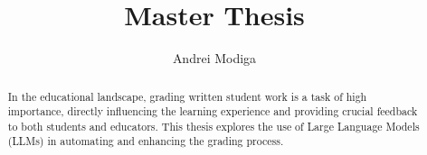 \documentclass[ms,twoside,print]{nuthesis}
\begin{document}
\frontmatter

\title{Master Thesis}
\author{Andrei Modiga}



\maketitle

\begin{abstract}
In the educational landscape, grading written student work is a task of high importance, directly influencing the learning experience and providing crucial feedback to both students and educators. This thesis explores the use of Large Language Models (LLMs) in automating and enhancing the grading process.
\end{abstract}





\tableofcontents
\end{document}
